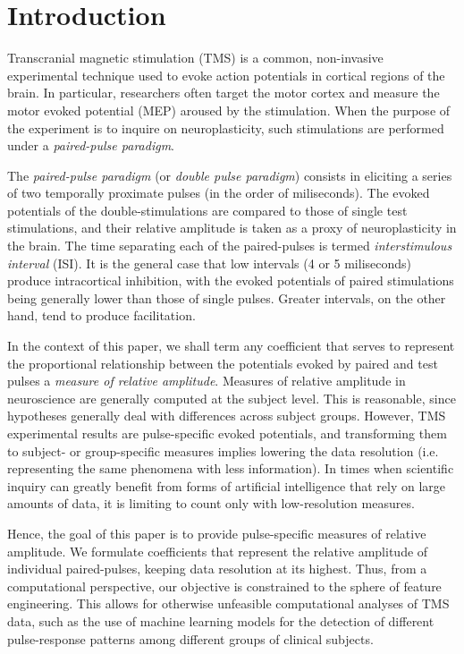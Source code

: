 \documentclass{article}
\begin{document}
\section{Introduction}
\newtheorem{definition}{Definition}
\newtheorem{remark}{Remark}

Transcranial magnetic stimulation (TMS) is a common, non-invasive experimental technique used to evoke action potentials in cortical regions of the brain. In particular, researchers often target the motor cortex and measure the motor evoked potential (MEP) aroused by the stimulation. When the purpose of the experiment is to inquire on neuroplasticity, such stimulations are performed under a \textit{paired-pulse paradigm}.

The \textit{paired-pulse paradigm} (or \textit{double pulse paradigm}) consists in eliciting a series of two temporally proximate pulses (in the order of miliseconds). The evoked potentials of the double-stimulations are compared to those of single test stimulations, and their relative amplitude is taken as a proxy of neuroplasticity in the brain. The time separating each of the paired-pulses is termed \textit{interstimulous interval} (ISI). It is the general case that low intervals (4 or 5 miliseconds) produce intracortical inhibition, with the evoked potentials of paired stimulations being generally lower than those of single pulses. Greater intervals, on the other hand, tend to produce facilitation. 


In the context of this paper, we shall term any coefficient that serves to represent the proportional relationship between the potentials evoked by paired and test pulses a \textit{measure of relative amplitude}. Measures of relative amplitude in neuroscience are generally computed at the subject level. This is reasonable, since hypotheses generally deal with differences across subject groups. However, TMS experimental results are pulse-specific evoked potentials, and transforming them to subject- or group-specific measures implies lowering the data resolution (i.e. representing the same phenomena with less information). In times when scientific inquiry can greatly benefit from forms of artificial intelligence that rely on large amounts of data, it is limiting to count only with low-resolution measures.

Hence, the goal of this paper is to provide pulse-specific measures of relative amplitude. We formulate coefficients that represent the relative amplitude of individual paired-pulses, keeping data resolution at its highest. Thus, from a computational perspective, our objective is constrained to the sphere of feature engineering. This allows for otherwise unfeasible computational analyses of TMS data, such as the use of machine learning models for the detection of different pulse-response patterns among different groups of clinical subjects.
\end{document}
